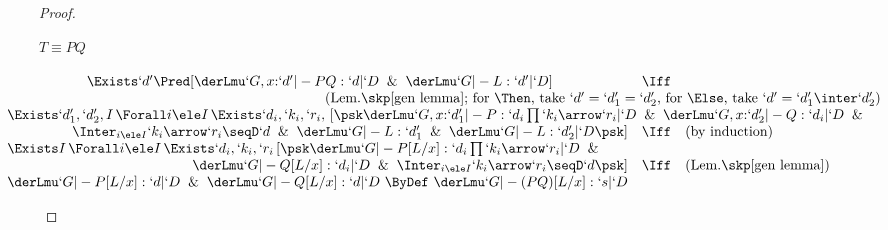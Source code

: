 \documentclass{lmcs}
\newcommand{\Comment}[1]{}
\begin{document}
\begin{proof}
\begin{enumerate}
\begin{description}
\Comment{%
 \item [$ T\same `l y.N $] 
$ \kern-24mm \begin{array}[t]{lcl} \kern24mm 
\derLmu `G,x{:}`d' |- `ly.N : `d | `D \And \derLmu `G |- L : `d' | `D 
	& \Iff & (\textrm{Lem.\skp\ref{gen lemma}}) \\
\multicolumn{3}{l}{ 
\Exists I \, \Forall i \ele I \, \Exists `d_i,`k_i,`r_i \Pred[ \derLmu `G,x{:}`d',y{:}`d_i |- N : `k_i\arrow `r_i | `D \And \Inter_{i \ele I} `d_i\prod `k_i\arrow `r_i \seqD `d \And \derLmu `G |- L : `d' | `D ] 
} \\ 
	& \Iff & (\textrm{by induction}) \\
\multicolumn{3}{l}{ 
\Exists I \, \Forall i \ele I \, \Exists `d_i,`k_i,`r_i \Pred[ \derLmu `G, y{:}`d_i |- N[L/x] : `k_i\arrow `r_i | `D \And \Inter_{i \ele I} `d_i\prod `k_i\arrow `r_i \seqD `d ] 
} \\
	& \Iff & (\textrm{Lem.\skp\ref{gen lemma}}) \\
\derLmu `G |- `ly.(N[L/x]) : `d | `D 
	~ \ByDef ~ 
\derLmu `G |- (`ly.N)[L/x] : `d | `D
 \end{array} $
 \arrayqed
}%

 \item [$ T \equiv PQ $] 
$ \kern-20mm \begin{array}[t]{lcl} \kern20mm 
\Exists `d' \Pred[ \derLmu `G,x{:}`d' |- PQ : `d | `D \And \derLmu `G |- L : `d' | `D ]
	& \Iff & \\ %
\multicolumn{3}{r}{(\textrm{Lem.\skp\ref{gen lemma}; for $\Then$, take $`d' = `d'_1 = `d'_2$, for $\Else$, take $`d' = `d'_1 \inter `d'_2$}) } \\
\multicolumn{3}{l}{\Exists `d'_1,`d'_2, I \, \Forall i \ele I \, \Exists `d_i,`k_i,`r_i, \, [\psk \derLmu `G,x{:}`d'_1 |- P : `d_i\prod `k_i\arrow `r_i | `D \And \derLmu `G,x{:}`d'_2 |- Q : `d_i | `D \And }
	\quad \\ ~ \quad \hfill 
\Inter_{i \ele I}`k_i\arrow `r_i \seqD `d \And \derLmu `G |- L : `d_1' \And \derLmu `G |- L : `d_2' | `D \psk] 
	& \Iff & (\textrm{by induction}) \\
\Exists I \, \Forall i \ele I \, \Exists `d_i,`k_i,`r_i \, [\psk \derLmu `G |- P[L/x] : `d_i\prod `k_i\arrow `r_i | `D \And 
	\quad \\ ~ \quad \hfill 
\derLmu `G |- Q[L/x] : `d_i | `D \And \Inter_{i \ele I}`k_i\arrow `r_i \seqD `d \psk] 
	& \Iff & (\textrm{Lem.\skp\ref{gen lemma}}) \\
\derLmu `G |- P[L/x] : `d | `D \And \derLmu `G |- Q[L/x] : `d | `D 
	~ \ByDef ~ 
\derLmu `G |- (PQ)[L/x] : `s | `D
 \end{array} $


\end{description}
\end{enumerate}
\end{proof}
\end{document}
